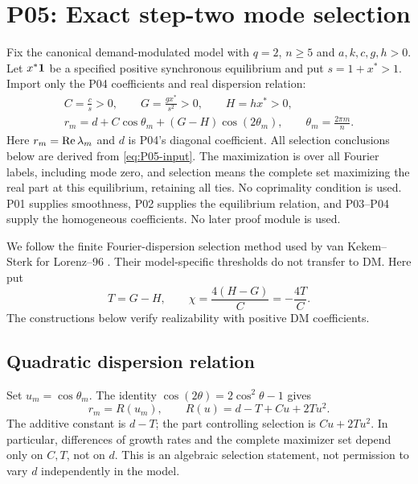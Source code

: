 \section{P05: Exact step-two mode selection}
\label{sec:P05}
Fix the canonical demand-modulated model with $q=2$, $n\ge5$ and
$a,k,c,g,h>0$. Let $x^*\mathbf{1}$ be a specified positive synchronous
equilibrium and put $s=1+x^*>1$. Import only the P04 coefficients
and real dispersion relation:
\begin{equation}
\begin{gathered}
 C=\frac cs>0,\qquad G=\frac{gx^*}{s^2}>0,\qquad H=hx^*>0,\\
 r_m=d+C\cos\theta_m+(G-H)\cos(2\theta_m),\qquad
 \theta_m=\frac{2\pi m}{n}.
\end{gathered}
 \label{eq:P05-input}
\end{equation}
Here $r_m=\operatorname{Re}\lambda_m$ and $d$ is P04's diagonal coefficient.
All selection conclusions below are derived from \eqref{eq:P05-input}.
The maximization is over all Fourier labels, including mode zero, and
selection means the complete set maximizing the real part at this
equilibrium, retaining all ties. No coprimality condition is used.
P01 supplies smoothness, P02 supplies the equilibrium relation, and P03--P04
supply the homogeneous coefficients. No later proof module is used.


We follow the finite Fourier-dispersion selection method used by
van Kekem--Sterk for Lorenz--96 \cite[\S2.1, Proposition~5]{vanKekemSterk2018}.
Their model-specific thresholds do not transfer to DM. Here put
\begin{equation}
 T=G-H,\qquad \chi=\frac{4(H-G)}C=-\frac{4T}C.
 \label{eq:P05-control}
\end{equation}
The constructions below verify realizability with positive DM coefficients.

\subsection{Quadratic dispersion relation}
\label{slot:P05-1}
Set $u_m=\cos\theta_m$. The identity $\cos(2\theta)=2\cos^2\theta-1$
gives
\begin{equation}
 r_m=R(u_m),\qquad
 \boxed{R(u)=d-T+Cu+2Tu^2.}
 \label{eq:P05-quadratic}
\end{equation}
The additive constant is $d-T$; the part controlling selection is
$Cu+2Tu^2$. In particular, differences of growth rates and the complete
maximizer set depend only on $C,T$, not on $d$. This is an algebraic
selection statement, not permission to vary $d$ independently in the model.

